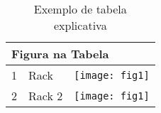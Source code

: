 \begin{table}[h!]
\centering
\caption{Exemplo de tabela explicativa}
\label{fig4}
\begin{tabular}{|l|l|l|}
\hline
\multicolumn{3}{|l|}{Figura na Tabela} \\ \hline
1        & Rack          & \texttt{[image: fig1]}        \\ \hline
2        & Rack 2        & \texttt{[image: fig1]}        \\ \hline
\end{tabular}
\end{table}